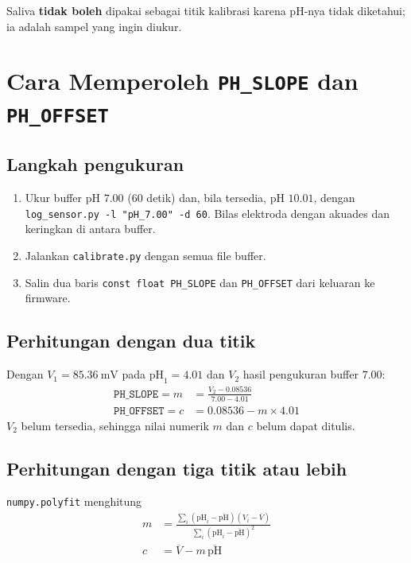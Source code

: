 \documentclass[12pt,a4paper]{article}
\begin{document}
Saliva \textbf{tidak boleh} dipakai sebagai titik kalibrasi karena pH-nya tidak diketahui; ia adalah sampel yang ingin diukur.

\section{Cara Memperoleh \texttt{PH\_SLOPE} dan \texttt{PH\_OFFSET}}

\subsection{Langkah pengukuran}
\begin{enumerate}
    \item Ukur buffer pH $7.00$ (60 detik) dan, bila tersedia, pH $10.01$, dengan \texttt{log\_sensor.py -l "pH\_7.00" -d 60}. Bilas elektroda dengan akuades dan keringkan di antara buffer.
    \item Jalankan \texttt{calibrate.py} dengan semua file buffer.
    \item Salin dua baris \texttt{const float PH\_SLOPE} dan \texttt{PH\_OFFSET} dari keluaran ke firmware.
\end{enumerate}

\subsection{Perhitungan dengan dua titik}
Dengan $V_1 = 85.36\ \text{mV}$ pada $\text{pH}_1 = 4.01$ dan $V_2$ hasil pengukuran buffer $7.00$:
\begin{align}
\texttt{PH\_SLOPE} = m &= \frac{V_2 - 0.08536}{7.00 - 4.01} \\
\texttt{PH\_OFFSET} = c &= 0.08536 - m \times 4.01
\end{align}
$V_2$ belum tersedia, sehingga nilai numerik $m$ dan $c$ belum dapat ditulis.

\subsection{Perhitungan dengan tiga titik atau lebih}
\texttt{numpy.polyfit} menghitung
\begin{align}
m &= \frac{\sum_i (\text{pH}_i - \overline{\text{pH}})(V_i - \overline{V})}{\sum_i (\text{pH}_i - \overline{\text{pH}})^2} \\
c &= \overline{V} - m\,\overline{\text{pH}}
\end{align}
\end{document}
